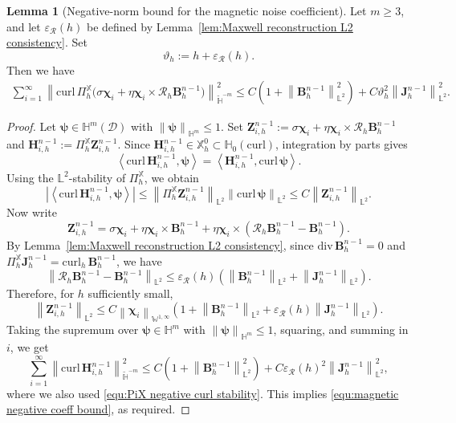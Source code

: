 \documentclass[11pt, reqno]{amsart}
\theoremstyle{definition}
\newtheorem{lemma}[theorem]{Lemma}
\numberwithin{equation}{section}
\newcommand{\curl}{\mathrm{curl}\,}
\newcommand{\divg}{\mathrm{div}\,}
\newcommand{\bff}{\boldsymbol}
\newcommand{\bb}{\mathbb}
\newcommand{\norm}[2]{\left\|{#1}\right\|_{#2}}
\newcommand{\inpro}[2]{\left\langle#1,#2\right\rangle}
\newcommand{\abs}[1]{\left|{#1}\right|}
\newcommand{\hzerocurl}{\mathbb{H}_0(\mathrm{curl})}
\newcommand{\curlh}{\mathrm{curl}_h\,}
\begin{document}
\begin{lemma}[Negative-norm bound for the magnetic noise coefficient]
	\label{lem:magnetic noise negative coefficient}
	Let \(m\ge3\), and let \(\varepsilon_{\mathcal R}(h)\) be defined by
	Lemma~\ref{lem:Maxwell reconstruction L2 consistency}.  Set
	\begin{equation}\label{equ:vartheta}
		\vartheta_h:=h+\varepsilon_{\mathcal R}(h).
	\end{equation}
	Then we have
	\begin{align}
		\label{equ:magnetic negative coeff bound}
		\sum_{i=1}^{\infty}
		\norm{\curl\Pi_h^{\bb X}
			\bigl(
			\sigma\bff\chi_i
			+
			\eta\bff\chi_i\times\mathcal R_h\bff B_h^{n-1}
			\bigr)}{\widetilde{\bb H}^{-m}}^2
		\le
		C\left(
		1+\norm{\bff B_h^{n-1}}{\bb L^2}^{2}
		\right)
		+
		C\vartheta_h^2
		\norm{\bff J_h^{n-1}}{\bb L^2}^{2}.
	\end{align}
\end{lemma}

\begin{proof}
	Let $\bff\psi\in\bb H^m(\mathscr D)$ with
	$\norm{\bff\psi}{\bb H^m}\le1$. Set $\bff Z_{i,h}^{n-1}
	:=
	\sigma\bff\chi_i
	+
	\eta\bff\chi_i\times\mathcal R_h\bff B_h^{n-1}$ and $\bff H_{i,h}^{n-1}
	:=
	\Pi_h^{\bb X}\bff Z_{i,h}^{n-1}$.
	Since $\bff H_{i,h}^{n-1}\in\bb X_h^0\subset\hzerocurl$, integration by parts
	gives
	\[
	\inpro{\curl\bff H_{i,h}^{n-1}}{\bff\psi}
	=
	\inpro{\bff H_{i,h}^{n-1}}{\curl\bff\psi}.
	\]
	Using the $\bb L^2$-stability of $\Pi_h^{\bb X}$, we obtain
	\[
	\abs{
		\inpro{\curl\bff H_{i,h}^{n-1}}{\bff\psi}
	}
	\le
	\norm{\Pi_h^{\bb X}\bff Z_{i,h}^{n-1}}{\bb L^2}
	\norm{\curl\bff\psi}{\bb L^2}
	\le
	C\norm{\bff Z_{i,h}^{n-1}}{\bb L^2}.
	\]
	Now write
	\[
	\bff Z_{i,h}^{n-1}
	=
	\sigma\bff\chi_i
	+
	\eta\bff\chi_i\times\bff B_h^{n-1}
	+
	\eta\bff\chi_i\times
	\left(
	\mathcal R_h\bff B_h^{n-1}-\bff B_h^{n-1}
	\right).
	\]
	By Lemma~\ref{lem:Maxwell reconstruction L2 consistency}, since
	$\divg\bff B_h^{n-1}=0$ and
	$\Pi_h^{\bb{X}} \bff J_h^{n-1}=\curlh\bff B_h^{n-1}$, we have
	\[
	\norm{\mathcal R_h\bff B_h^{n-1}-\bff B_h^{n-1}}{\bb L^2}
	\le
	\varepsilon_{\mathcal R}(h)
	\left(
	\norm{\bff B_h^{n-1}}{\bb L^2}
	+
	\norm{\bff J_h^{n-1}}{\bb L^2}
	\right).
	\]
	Therefore, for $h$ sufficiently small,
	\[
	\norm{\bff Z_{i,h}^{n-1}}{\bb L^2}
	\le
	C\norm{\bff\chi_i}{\bb W^{1,\infty}}
	\left(
	1+\norm{\bff B_h^{n-1}}{\bb L^2}
	+
	\varepsilon_{\mathcal R}(h)
	\norm{\bff J_h^{n-1}}{\bb L^2}
	\right).
	\]
	Taking the supremum over
	$\bff\psi\in\bb H^m$ with $\norm{\bff\psi}{\bb H^m}\le1$, squaring, and
	summing in $i$, we get
	\[
	\sum_{i=1}^{\infty}
	\norm{\curl\bff H_{i,h}^{n-1}}{\widetilde{\bb H}^{-m}}^2
	\le
	C\left(
	1+\norm{\bff B_h^{n-1}}{\bb L^2}^{2}
	\right)
	+
	C\varepsilon_{\mathcal R}(h)^2
	\norm{\bff J_h^{n-1}}{\bb L^2}^{2},
	\]
	where we also used \eqref{equ:PiX negative curl stability}.
	This implies
	\eqref{equ:magnetic negative coeff bound}, as required.
\end{proof}
\end{document}
